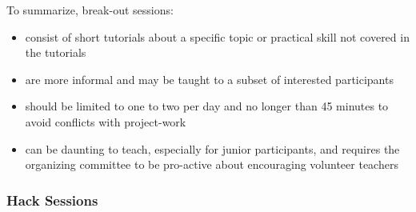 \documentclass{nature}
\begin{document}
To summarize, break-out sessions:
\begin{itemize}
\item consist of short tutorials about a specific topic or practical skill not covered in the tutorials
\item are more informal and may be taught to a subset of interested participants
\item should be limited to one to two per day and no longer than 45 minutes to avoid conflicts with project-work
\item can be daunting to teach, especially for junior participants, and requires the organizing committee to be pro-active about encouraging volunteer teachers
\end{itemize}

\subsubsection{Hack Sessions}
\end{document}
